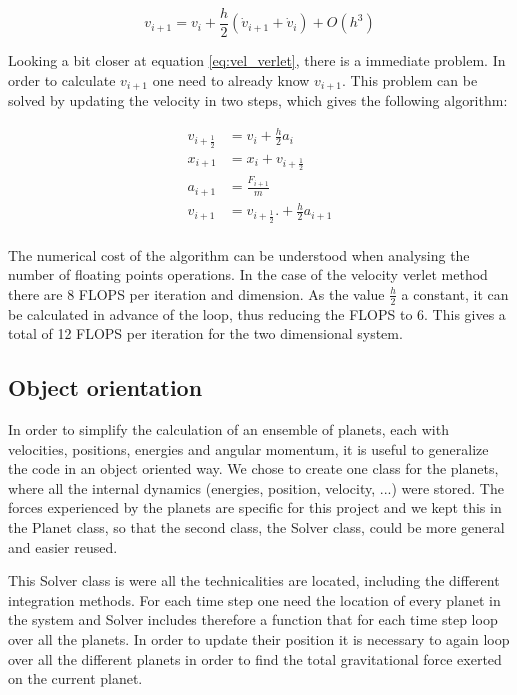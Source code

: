 \begin{equation}
v_{i+1} = v_i +  \frac{h}{2} \left(\dot{v}_{i+1}+\dot{v}_i\right)+ O(h^3) \label{eq:vel_verlet}
\end{equation}

Looking a bit closer at equation \ref{eq:vel_verlet}, there is a immediate problem. In order to calculate $ v_{i+1} $ one need to already know $ v_{i+1} $. This problem can be solved by updating the velocity in two steps, which gives the following algorithm:

\begin{align}
v_{i+\frac{1}{2}} &= v_i + \frac{h}{2} a_i\\
x_{i+1} &= x_i + v_{i+\frac{1}{2}}\\
a_{i+1} &= \frac{F_{i+1}}{m}\\
v_{i+1} &=v_{i+\frac{1}{2}}. + \frac{h}{2} a_{i+1}\\
\end{align} 

The numerical cost of the algorithm can be understood when analysing the number of floating points operations. In the case of the velocity verlet method there are 8 FLOPS per iteration and dimension. As the value $ \frac{h}{2} $ a constant, it can be calculated in advance of the loop, thus reducing the FLOPS to 6. This gives a total of 12 FLOPS per iteration for the two dimensional system. 






\subsection{Object orientation}
In order to simplify the calculation of an ensemble of planets, each with velocities, positions, energies and angular momentum, it is useful to generalize the code in an object oriented way. We chose to create one class for the planets, where all the internal dynamics (energies, position, velocity, ...) were stored. The forces experienced by the planets are specific for this project and we kept this in the Planet class, so that the second class, the Solver class, could be more general and easier reused.

This Solver class is were all the technicalities are located, including the different integration methods. For each time step one need the location of every planet in the system and Solver includes therefore a function that for each time step loop over all the planets. In order to update their position it is necessary to again loop over all the different planets in order to find the total gravitational force exerted on the current planet.  

